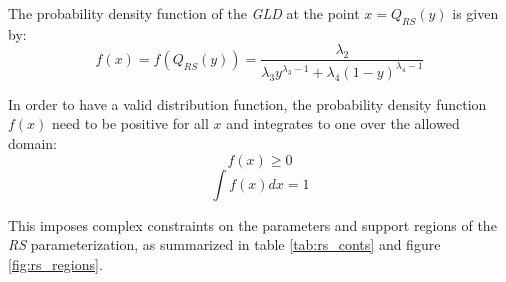 The probability density function of the \textit{GLD} at the point $x=Q_{RS}(y)$ is given by:
\begin{equation}\label{eq:rs_pdf}
f(x)=f(Q_{RS}(y))=\frac{\lambda_{2}}{\lambda_{3}y^{\lambda_{3}-1}+\lambda_{4}(1-y)^{\lambda_{4}-1}}
\end{equation}

In order to have a valid distribution function, the probability density function $f(x)$ need to be positive for all $x$ and integrates to one over the allowed domain:
\begin{equation}
f(x) \geqslant 0
\end{equation}
\begin{equation}
\int f(x)dx=1
\end{equation}

This imposes complex constraints on the parameters and support regions of the \textit{RS} parameterization, as summarized in table \ref{tab:rs_conts} and figure \ref{fig:rs_regions}.

